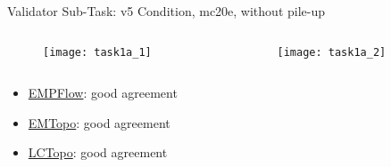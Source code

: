 \begin{frame}{Validator Sub-Task: v5 Condition, mc20e, without pile-up}
    \begin{columns}
        \begin{column}{0.5\textwidth}
            \begin{figure}
                \centering
                \texttt{[image: task1a\_1]}
            \end{figure}
        \end{column}
        \begin{column}{0.5\textwidth}
            \begin{figure}
                \centering
                \texttt{[image: task1a\_2]}
            \end{figure}
        \end{column}
    \end{columns}
        \begin{itemize}
        \item \href{https://atlas-computing.web.cern.ch/atlas-computing/links/PhysValDir/JetEtMiss/jet_21-07-08_task1/AntiKt4EMPFlowJets/index.html}{EMPFlow}: good agreement
        \item \href{https://atlas-computing.web.cern.ch/atlas-computing/links/PhysValDir/JetEtMiss/jet_21-07-08_task1/AntiKt4EMTopoJets/index.html}{EMTopo}: good agreement
        \item \href{https://atlas-computing.web.cern.ch/atlas-computing/links/PhysValDir/JetEtMiss/jet_21-07-08_task1/AntiKt4LCTopoJets/index.html}{LCTopo}: good agreement 
    \end{itemize}
\end{frame}